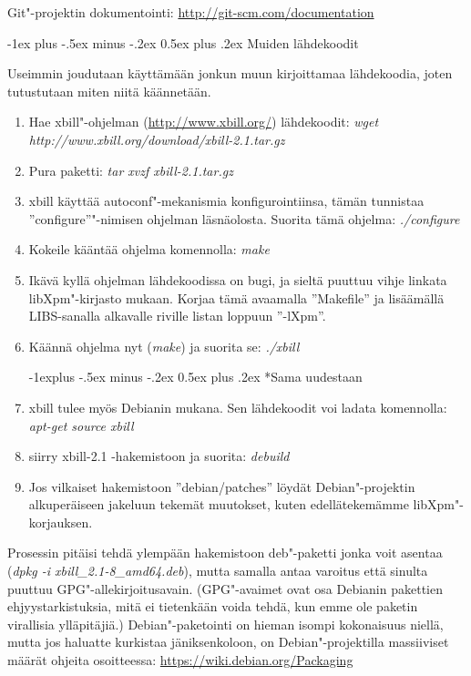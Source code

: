 \documentclass[12pt,portrait,a4]{article}
\makeatletter
\renewcommand{\section}{\@startsection{section}{1}{0mm}%
                                {-1ex plus -.5ex minus -.2ex}%
                                {0.5ex plus .2ex}%
                                {\normalfont\large\bfseries}}
\renewcommand{\subsection}{\@startsection{subsection}{2}{0mm}%
                                {-1explus -.5ex minus -.2ex}%
                                {0.5ex plus .2ex}%
                                {\normalfont\normalsize\bfseries}}
\makeatother
\begin{document}
Git"-projektin dokumentointi: \url{http://git-scm.com/documentation}


\section{Muiden lähdekoodit}

Useimmin joudutaan käyttämään jonkun muun kirjoittamaa lähdekoodia, joten
tutustutaan miten niitä käännetään.

\begin{enumerate}
\item Hae xbill"-ohjelman (\url{http://www.xbill.org/}) lähdekoodit:
\emph{wget http://www.xbill.org/download/xbill-2.1.tar.gz}
\item Pura paketti: \emph{tar xvzf xbill-2.1.tar.gz}
\item xbill käyttää autoconf"-mekanismia konfigurointiinsa, tämän tunnistaa
''configure''"-nimisen ohjelman läsnäolosta.  Suorita tämä ohjelma:
\emph{./configure}
\item Kokeile kääntää ohjelma komennolla: \emph{make}
\item Ikävä kyllä ohjelman lähdekoodissa on bugi, ja sieltä puuttuu vihje
linkata libXpm"-kirjasto mukaan.  Korjaa tämä avaamalla ''Makefile'' ja
lisäämällä LIBS-sanalla alkavalle riville listan loppuun ''-lXpm''.
\item Käännä ohjelma nyt (\emph{make}) ja suorita se: \emph{./xbill}

\subsection*{Sama uudestaan}

\item xbill tulee myös Debianin mukana.  Sen lähdekoodit voi ladata
komennolla: \emph{apt-get source xbill}
\item siirry xbill-2.1 -hakemistoon ja suorita: \emph{debuild}
\item Jos vilkaiset hakemistoon ''debian/patches'' löydät Debian"-projektin
alkuperäiseen jakeluun tekemät muutokset, kuten edellätekemämme
libXpm"-korjauksen.
\end{enumerate}

Prosessin pitäisi tehdä ylempään hakemistoon deb"-paketti jonka voit asentaa
(\emph{dpkg -i xbill\_2.1-8\_amd64.deb}), mutta samalla antaa varoitus että
sinulta puuttuu GPG"-allekirjoitusavain.  (GPG"-avaimet ovat osa Debianin
pakettien ehjyystarkistuksia, mitä ei tietenkään voida tehdä, kun emme ole
paketin virallisia ylläpitäjiä.) Debian"-paketointi on hieman isompi
kokonaisuus niellä, mutta jos haluatte kurkistaa jäniksenkoloon, on
Debian"-projektilla massiiviset määrät ohjeita osoitteessa:
\url{https://wiki.debian.org/Packaging}
\end{document}
